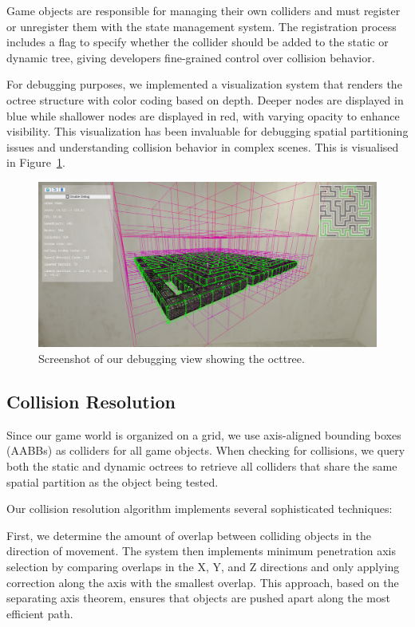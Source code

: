 \documentclass{article}
\begin{document}
Game objects are responsible for managing their own colliders and must register
or unregister them with the state management system. The registration process
includes a flag to specify whether the collider should be added to the static
or dynamic tree, giving developers fine-grained control over collision
behavior.

For debugging purposes, we implemented a visualization system that renders the
octree structure with color coding based on depth. Deeper nodes are displayed
in blue while shallower nodes are displayed in red, with varying opacity to
enhance visibility. This visualization has been invaluable for debugging
spatial partitioning issues and understanding collision behavior in complex
scenes. This is visualised in Figure~\ref{fig:octree}.

\begin{figure}[H]
    \centering
    \includegraphics[width=\textwidth]{diagrams/octree.png}
    \caption{Screenshot of our debugging view showing the octtree.}
    \label{fig:octree}
\end{figure}

\subsection{Collision Resolution}
Since our game world is organized on a grid, we use axis-aligned bounding boxes
(AABBs) as colliders for all game objects. When checking for collisions, we
query both the static and dynamic octrees to retrieve all colliders that share
the same spatial partition as the object being tested.

Our collision resolution algorithm implements several sophisticated techniques:

First, we determine the amount of overlap between colliding objects in the
direction of movement. The system then implements minimum penetration axis
selection by comparing overlaps in the X, Y, and Z directions and only applying
correction along the axis with the smallest overlap. This approach, based on
the separating axis theorem, ensures that objects are pushed apart along the
most efficient path.
\end{document}
